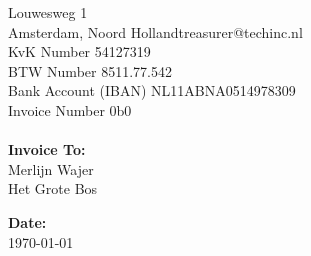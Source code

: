 \documentclass{invoice} %
\def \tab {\hspace*{3ex}} %
\begin{document}
\hspace{-23em}
Louwesweg 1 \\ %
Amsterdam, Noord Holland\hfill treasurer@techinc.nl \\
KvK Number \hfill 54127319 \\
BTW Number \hfill 8511.77.542  \\
Bank Account (IBAN) \hfill NL11ABNA0514978309 \\
Invoice Number \hfill 0b0
\\ \\
{\bf Invoice To:} \\
\tab Merlijn Wajer \\
\tab Het Grote Bos

{\bf Date:} \\
\tab \today \\

\begin{invoiceTable}



\end{invoiceTable}

\end{document}
